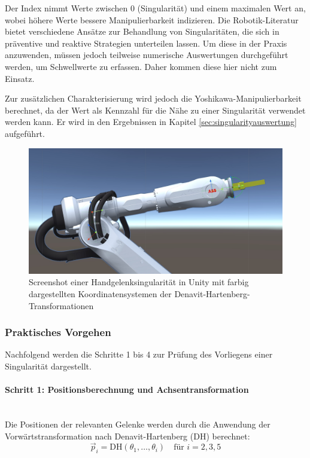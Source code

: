 Der Index nimmt Werte zwischen 0 (Singularität) und einem maximalen Wert an,
wobei höhere Werte bessere Manipulierbarkeit indizieren. Die Robotik-Literatur
bietet verschiedene Ansätze zur Behandlung von Singularitäten, die sich in
präventive und reaktive Strategien unterteilen lassen. Um diese in der Praxis
anzuwenden, müssen jedoch teilweise numerische Auswertungen durchgeführt werden,
um Schwellwerte zu erfassen. Daher kommen diese hier nicht zum Einsatz.

Zur zusätzlichen Charakterisierung wird jedoch die Yoshikawa-Manipulierbarkeit
berechnet, da der Wert als Kennzahl für die Nähe zu einer Singularität verwendet
werden kann. Er wird in den Ergebnissen in Kapitel
\ref{sec:singularityauswertung} aufgeführt.

\begin{figure}[H]
  \centering
  \includegraphics[width=\linewidth]{Figures/wristSingularityScreenshot.jpg}
  \caption{Screenshot einer Handgelenksingularität in Unity mit farbig
  dargestellten Koordinatensystemen der Denavit-Hartenberg-Transformationen}
  \label{figure:wristSingularity}
\end{figure}

\subsubsection{Praktisches Vorgehen} \label{sssec:Framework_Implementierung}
Nachfolgend werden die Schritte 1 bis 4 zur Prüfung des Vorliegens
einer Singularität dargestellt.

\paragraph{Schritt 1: Positionsberechnung und Achsentransformation}~\\
Die Positionen der relevanten Gelenke werden durch die Anwendung der
Vorwärtstransformation nach Denavit-Hartenberg (DH)
berechnet:
\begin{equation}
  \vec{p}_i = \text{DH}(\theta_1, \ldots, \theta_i) \quad \text{für }
  i = 2, 3, 5
  \label{eq:position_calculation}
\end{equation}

